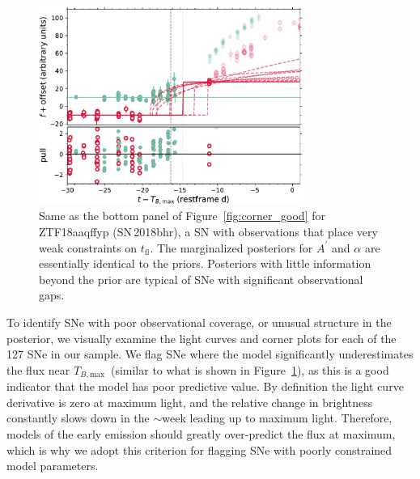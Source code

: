 \documentclass[twocolumn]{./aastex63}
\newcommand{\tfl}{$t_\mathrm{fl}$}
\newcommand{\tbmax}{$T_{B,\mathrm{max}}$}
\begin{document}
\begin{figure}
    \centering
    \includegraphics[width=3.4in]{./figures/ZTF18aaqffyp_model_lc.pdf}
    \caption{Same as the bottom panel of Figure~\ref{fig:corner_good} for
    ZTF18aaqffyp (SN\,2018bhr), a SN with observations that place very weak
    constraints on \tfl. The marginalized posteriors for $A^\prime$ and
    $\alpha$ are essentially identical to the priors. Posteriors with little
    information beyond the prior are typical of SNe with significant
    observational gaps.}
    \label{fig:biggap_lc}
\end{figure}

To identify SNe with poor observational coverage, or unusual structure in the
posterior, we visually examine the light curves and corner plots for each of
the 127 SNe in our sample. We flag SNe where the model significantly
underestimates the flux near \tbmax\ (similar to what is shown in
Figure~\ref{fig:biggap_lc}), as this is a good indicator that the model has
poor predictive value. By definition the light curve derivative is zero at
maximum light, and the relative change in brightness constantly slows down in
the $\sim$week leading up to maximum light. Therefore, models of the early
emission should greatly over-predict the flux at maximum, which is why we
adopt this criterion for flagging SNe with poorly constrained model
parameters.
\end{document}
